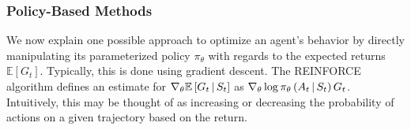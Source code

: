 \subsubsection{Policy-Based Methods}
We now explain one possible approach to optimize an agent's behavior by directly manipulating its parameterized policy $\pi_\theta$ with regards to the expected returns $\mathbb{E}\left[G_t\right]$. Typically, this is done using gradient descent. The REINFORCE algorithm \cite{reinforce} defines an estimate for $\nabla_\theta \mathbb{E}\left[G_t \,\middle|\, S_t \right]$ as $\nabla_\theta \log \pi_\theta\left(A_t \,\middle|\, S_t\right) G_t$. Intuitively, this may be thought of as increasing or decreasing the probability of actions on a given trajectory based on the return.